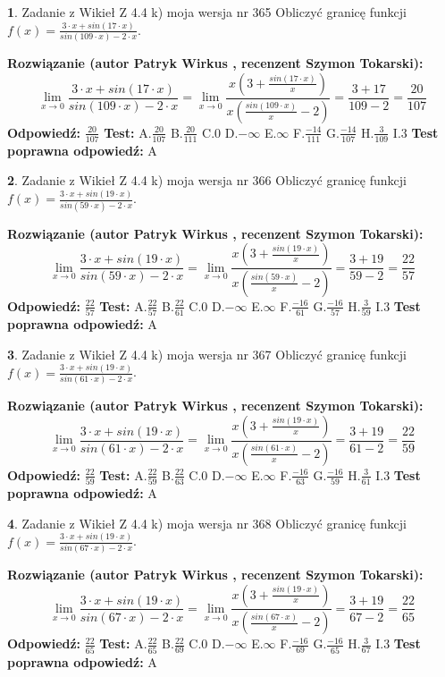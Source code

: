\documentclass[12pt, a4paper]{article}
\theoremstyle{definition} %
\newtheorem{zad}{}
\newcommand{\zadStart}[1]{\begin{zad}#1\newline}
\newcommand{\zadStop}{\end{zad}}
\newcommand{\rozwStart}[2]{\noindent \textbf{Rozwiązanie (autor #1 , recenzent #2): }\newline}
\newcommand{\rozwStop}{\newline}
\newcommand{\odpStart}{\noindent \textbf{Odpowiedź:}\newline}
\newcommand{\odpStop}{\newline}
\newcommand{\testStart}{\noindent \textbf{Test:}\newline}
\newcommand{\testStop}{\newline}
\newcommand{\kluczStart}{\noindent \textbf{Test poprawna odpowiedź:}\newline}
\newcommand{\kluczStop}{\newline}
\begin{document}
\zadStart{Zadanie z Wikieł Z 4.4 k) moja wersja nr 365}
Obliczyć granicę funkcji $f(x)=\frac{3\cdot x +sin(17\cdot x)}{sin(109\cdot x) -2\cdot x}$.
\zadStop
\rozwStart{Patryk Wirkus}{Szymon Tokarski}
$$\lim\limits_{x\to 0}\frac{3\cdot x +sin(17\cdot x)}{sin(109\cdot x) -2\cdot x}
=\lim\limits_{x\to 0}\frac{x(3+\frac{sin(17\cdot x)}{x})}{x(\frac{sin(109\cdot x)}{x}-2)}
=\frac{3+17}{109-2} = \frac{20}{107}$$
\rozwStop
\odpStart
$\frac{20}{107}$
\odpStop
\testStart
A.$\frac{20}{107}$
B.$\frac{20}{111}$
C.$0$
D.$-\infty$
E.$\infty$
F.$\frac{-14}{111}$
G.$\frac{-14}{107}$
H.$\frac{3}{109}$
I.$3$
\testStop
\kluczStart
A
\kluczStop



\zadStart{Zadanie z Wikieł Z 4.4 k) moja wersja nr 366}
Obliczyć granicę funkcji $f(x)=\frac{3\cdot x +sin(19\cdot x)}{sin(59\cdot x) -2\cdot x}$.
\zadStop
\rozwStart{Patryk Wirkus}{Szymon Tokarski}
$$\lim\limits_{x\to 0}\frac{3\cdot x +sin(19\cdot x)}{sin(59\cdot x) -2\cdot x}
=\lim\limits_{x\to 0}\frac{x(3+\frac{sin(19\cdot x)}{x})}{x(\frac{sin(59\cdot x)}{x}-2)}
=\frac{3+19}{59-2} = \frac{22}{57}$$
\rozwStop
\odpStart
$\frac{22}{57}$
\odpStop
\testStart
A.$\frac{22}{57}$
B.$\frac{22}{61}$
C.$0$
D.$-\infty$
E.$\infty$
F.$\frac{-16}{61}$
G.$\frac{-16}{57}$
H.$\frac{3}{59}$
I.$3$
\testStop
\kluczStart
A
\kluczStop



\zadStart{Zadanie z Wikieł Z 4.4 k) moja wersja nr 367}
Obliczyć granicę funkcji $f(x)=\frac{3\cdot x +sin(19\cdot x)}{sin(61\cdot x) -2\cdot x}$.
\zadStop
\rozwStart{Patryk Wirkus}{Szymon Tokarski}
$$\lim\limits_{x\to 0}\frac{3\cdot x +sin(19\cdot x)}{sin(61\cdot x) -2\cdot x}
=\lim\limits_{x\to 0}\frac{x(3+\frac{sin(19\cdot x)}{x})}{x(\frac{sin(61\cdot x)}{x}-2)}
=\frac{3+19}{61-2} = \frac{22}{59}$$
\rozwStop
\odpStart
$\frac{22}{59}$
\odpStop
\testStart
A.$\frac{22}{59}$
B.$\frac{22}{63}$
C.$0$
D.$-\infty$
E.$\infty$
F.$\frac{-16}{63}$
G.$\frac{-16}{59}$
H.$\frac{3}{61}$
I.$3$
\testStop
\kluczStart
A
\kluczStop



\zadStart{Zadanie z Wikieł Z 4.4 k) moja wersja nr 368}
Obliczyć granicę funkcji $f(x)=\frac{3\cdot x +sin(19\cdot x)}{sin(67\cdot x) -2\cdot x}$.
\zadStop
\rozwStart{Patryk Wirkus}{Szymon Tokarski}
$$\lim\limits_{x\to 0}\frac{3\cdot x +sin(19\cdot x)}{sin(67\cdot x) -2\cdot x}
=\lim\limits_{x\to 0}\frac{x(3+\frac{sin(19\cdot x)}{x})}{x(\frac{sin(67\cdot x)}{x}-2)}
=\frac{3+19}{67-2} = \frac{22}{65}$$
\rozwStop
\odpStart
$\frac{22}{65}$
\odpStop
\testStart
A.$\frac{22}{65}$
B.$\frac{22}{69}$
C.$0$
D.$-\infty$
E.$\infty$
F.$\frac{-16}{69}$
G.$\frac{-16}{65}$
H.$\frac{3}{67}$
I.$3$
\testStop
\kluczStart
A
\kluczStop
\end{document}
